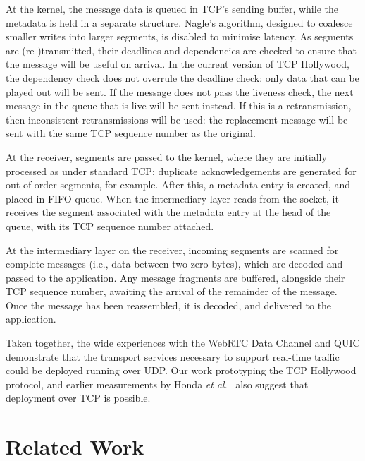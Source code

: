 \documentclass[10pt]{sig-alternate-05-2015}
\newcommand{\todo}[1]{\textbf{\textcolor{red}{To do -- #1}}}
\begin{document}
At the kernel, the message data is queued in TCP's sending buffer, while
the metadata is held in a separate structure. Nagle's algorithm, designed
to coalesce smaller writes into larger segments, is disabled to minimise
latency. As segments are (re-)transmitted, their deadlines and dependencies
are checked to ensure that the message will be useful on arrival. In the
current version of TCP Hollywood, the dependency check does not overrule
the deadline check: only data that can be played out will be sent. If the
message does not pass the liveness check, the next message in the queue
that is live will be sent instead. If this is a retransmission, then
inconsistent retransmissions will be used: the replacement message will be
sent with the same TCP sequence number as the original.

At the receiver, segments are passed to the kernel, where they are
initially processed as under standard TCP: duplicate acknowledgements are
generated for out-of-order segments, for example. After this, a metadata
entry is created, and placed in FIFO queue. When the intermediary layer
reads from the socket, it receives the segment associated with the
metadata entry at the head of the queue, with its TCP sequence number
attached.

At the intermediary layer on the receiver, incoming segments are scanned
for complete messages (i.e., data between two zero bytes), which are
decoded and passed to the application. Any message fragments are buffered,
alongside their TCP sequence number, awaiting the arrival of the remainder
of the message. Once the message has been reassembled, it is decoded, and
delivered to the application.


Taken together, the wide experiences with the WebRTC Data Channel and QUIC
demonstrate that the transport services necessary to support real-time
traffic could be deployed running over UDP. Our work prototyping the TCP
Hollywood protocol, and earlier measurements by Honda \emph{et al}.\
\cite{honda:2011:extend-tcp} also suggest that deployment over TCP is
possible.

\section{Related Work}
\label{sec:related}
\end{document}
